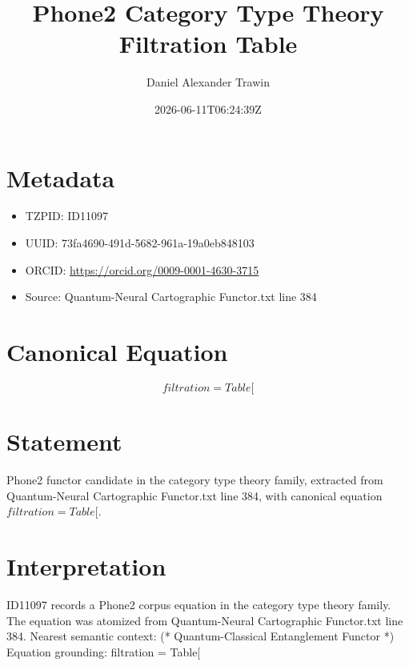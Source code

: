 \documentclass[11pt]{article}
\title{Phone2 Category Type Theory Filtration Table}
\author{Daniel Alexander Trawin}
\date{2026-06-11T06:24:39Z}
\begin{document}
\maketitle
\section*{Metadata}
\begin{itemize}
\item TZPID: ID11097
\item UUID: 73fa4690-491d-5682-961a-19a0eb848103
\item ORCID: \url{https://orcid.org/0009-0001-4630-3715}
\item Source: Quantum-Neural Cartographic Functor.txt line 384
\end{itemize}
\section*{Canonical Equation}
\[
filtration = Table[
\]
\section*{Statement}
Phone2 functor candidate in the category type theory family, extracted from Quantum-Neural Cartographic Functor.txt line 384, with canonical equation $filtration = Table[$.
\section*{Interpretation}
ID11097 records a Phone2 corpus equation in the category type theory family. The equation was atomized from Quantum-Neural Cartographic Functor.txt line 384. Nearest semantic context: (* Quantum-Classical Entanglement Functor *) Equation grounding: filtration = Table[
\end{document}
